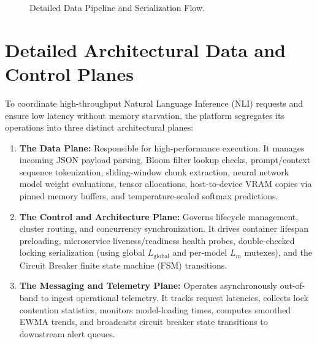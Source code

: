 \documentclass[11pt,a4paper]{article}
\theoremstyle{plain}
\theoremstyle{definition}
\theoremstyle{remark}
\newcommand{\Lm}{L_m}
\newcommand{\Lg}{L_{\mathrm{global}}}
\begin{document}
\begin{figure}[H]
\caption{Detailed Data Pipeline and Serialization Flow.}
\label{fig:detailed-data-pipeline}
\end{figure}
\section{Detailed Architectural Data and Control Planes}\label{sec:planes}
To coordinate high-throughput Natural Language Inference (NLI) requests and ensure low latency without memory starvation, the platform segregates its operations into three distinct architectural planes:
\begin{enumerate}
    \item \textbf{The Data Plane:} Responsible for high-performance execution. It manages incoming JSON payload parsing, Bloom filter lookup checks, prompt/context sequence tokenization, sliding-window chunk extraction, neural network model weight evaluations, tensor allocations, host-to-device VRAM copies via pinned memory buffers, and temperature-scaled softmax predictions.
    \item \textbf{The Control and Architecture Plane:} Governs lifecycle management, cluster routing, and concurrency synchronization. It drives container lifespan preloading, microservice liveness/readiness health probes, double-checked locking serialization (using global $\Lg$ and per-model $\Lm$ mutexes), and the Circuit Breaker finite state machine (FSM) transitions.
    \item \textbf{The Messaging and Telemetry Plane:} Operates asynchronously out-of-band to ingest operational telemetry. It tracks request latencies, collects lock contention statistics, monitors model-loading times, computes smoothed EWMA trends, and broadcasts circuit breaker state transitions to downstream alert queues.
\end{enumerate}
\end{document}
